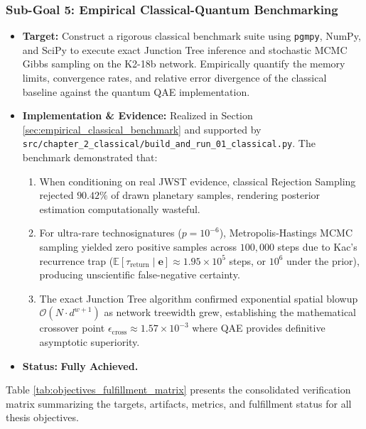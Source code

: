 \subsubsection{Sub-Goal 5: Empirical Classical-Quantum Benchmarking}
\begin{itemize}
    \item \textbf{Target:} Construct a rigorous classical benchmark suite using \texttt{pgmpy}, NumPy, and SciPy to execute exact Junction Tree inference and stochastic MCMC Gibbs sampling on the K2-18b network. Empirically quantify the memory limits, convergence rates, and relative error divergence of the classical baseline against the quantum QAE implementation.
    \item \textbf{Implementation \& Evidence:} Realized in Section \ref{sec:empirical_classical_benchmark} and supported by \texttt{src/chapter\_2\_classical/build\_and\_run\_01\_classical.py}. The benchmark demonstrated that:
    \begin{enumerate}
        \item When conditioning on real JWST evidence, classical Rejection Sampling rejected $90.42\%$ of drawn planetary samples, rendering posterior estimation computationally wasteful.
        \item For ultra-rare technosignatures ($p = 10^{-6}$), Metropolis-Hastings MCMC sampling yielded zero positive samples across $100,000$ steps due to Kac's recurrence trap ($\mathbb{E}[\tau_{\mathrm{return}} \mid \mathbf{e}] \approx 1.95 \times 10^5$ steps, or $10^6$ under the prior), producing unscientific false-negative certainty.
        \item The exact Junction Tree algorithm confirmed exponential spatial blowup $\mathcal{O}(N \cdot d^{w+1})$ as network treewidth grew, establishing the mathematical crossover point $\epsilon_{\mathrm{cross}} \approx 1.57 \times 10^{-3}$ where QAE provides definitive asymptotic superiority.
    \end{enumerate}
    \item \textbf{Status:} \textbf{Fully Achieved.}
\end{itemize}

Table \ref{tab:objectives_fulfillment_matrix} presents the consolidated verification matrix summarizing the targets, artifacts, metrics, and fulfillment status for all thesis objectives.

